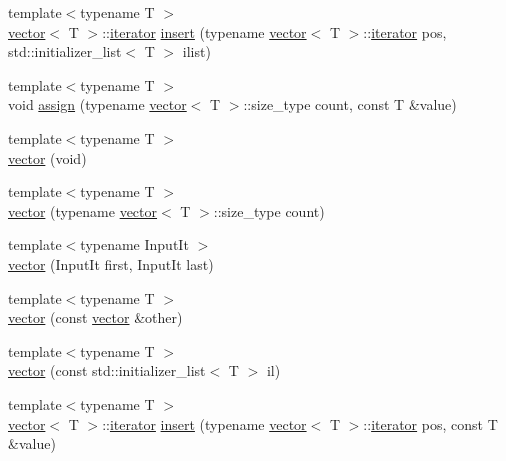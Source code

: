 \begin{DoxyCompactItemize}
\item 
{\footnotesize template$<$typename T $>$ }\\\mbox{\hyperlink{classsc_1_1vector}{vector}}$<$ T $>$\+::\mbox{\hyperlink{classsc_1_1vector_1_1iterator}{iterator}} \mbox{\hyperlink{classsc_1_1vector_a4e59b7f5bc99a5436397426626719251}{insert}} (typename \mbox{\hyperlink{classsc_1_1vector}{vector}}$<$ T $>$\+::\mbox{\hyperlink{classsc_1_1vector_1_1iterator}{iterator}} pos, std\+::initializer\+\_\+list$<$ T $>$ ilist)
\item 
{\footnotesize template$<$typename T $>$ }\\void \mbox{\hyperlink{classsc_1_1vector_a6905779e8818b55d12ce46b75ab983d6}{assign}} (typename \mbox{\hyperlink{classsc_1_1vector}{vector}}$<$ T $>$\+::size\+\_\+type count, const T \&value)
\item 
{\footnotesize template$<$typename T $>$ }\\\mbox{\hyperlink{classsc_1_1vector_a64ed605fc5b5449da4c90177268ff101}{vector}} (void)
\item 
{\footnotesize template$<$typename T $>$ }\\\mbox{\hyperlink{classsc_1_1vector_a09edcd127164af330873721038aa4ccc}{vector}} (typename \mbox{\hyperlink{classsc_1_1vector}{vector}}$<$ T $>$\+::size\+\_\+type count)
\item 
{\footnotesize template$<$typename Input\+It $>$ }\\\mbox{\hyperlink{classsc_1_1vector_ab58c55200c6a120b9d24793a271512fb}{vector}} (Input\+It first, Input\+It last)
\item 
{\footnotesize template$<$typename T $>$ }\\\mbox{\hyperlink{classsc_1_1vector_a6954f3fbe0bce1016e72da109a33ac27}{vector}} (const \mbox{\hyperlink{classsc_1_1vector}{vector}} \&other)
\item 
{\footnotesize template$<$typename T $>$ }\\\mbox{\hyperlink{classsc_1_1vector_a70d31da6728917d2a55f3c280351703e}{vector}} (const std\+::initializer\+\_\+list$<$ T $>$ il)
\item 
{\footnotesize template$<$typename T $>$ }\\\mbox{\hyperlink{classsc_1_1vector}{vector}}$<$ T $>$\+::\mbox{\hyperlink{classsc_1_1vector_1_1iterator}{iterator}} \mbox{\hyperlink{classsc_1_1vector_a1aaf0a1fcdac2a58a96a2a00105b2e1f}{insert}} (typename \mbox{\hyperlink{classsc_1_1vector}{vector}}$<$ T $>$\+::\mbox{\hyperlink{classsc_1_1vector_1_1iterator}{iterator}} pos, const T \&value)
\item 

\end{DoxyCompactItemize}
